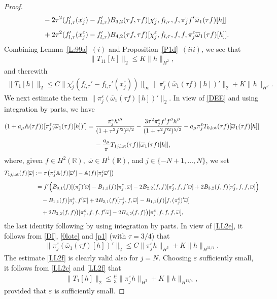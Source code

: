 \documentclass[11pt,reqno]{amsart}
\numberwithin{equation}{section}
\newcommand{\0}{\Omega}
\newcommand{\e}{\varepsilon}
\newcommand{\ov}{\overline}
\newcommand{\oo}{\ov\omega}
\newcommand{\bA}{\mathbb{A}}
\newcommand{\R}{\mathbb{R}}
\numberwithin{equation}{section}
\begin{document}
\begin{proof}
\begin{align*}
 &\hspace{0.424cm}-2\tau^2 (f_{l,\tau}'(x_j^\e)-f_{l,\tau}')B_{3,2}(\tau f, \tau f)  [\chi_j^\e,f_{l,\tau},f,\pi_j^\e f' \oo_1(\tau f)[h]]\\[1ex]
 &\hspace{0.424cm}+2\tau^2 (f_{l,\tau}'(x_j^\e)-f_{l,\tau}')B_{4,2}(\tau f, \tau f)  [\chi_j^\e,f_{l,\tau},f,f,\pi_j^\e \oo_1(\tau f)[h]].
\end{align*}
 Combining Lemma~\ref{L:99a}~$(i)$ and Proposition~\ref{P1d}~$(iii)$, we see that
 \begin{align*}
  \|T_{11}[h]\|_{2}\leq   K\|h\|_{H^2},
\end{align*}
and  therewith
 \begin{align}
  \|T_{1}[h]\|_{2}\leq   C\|\chi_j^\e(f_{l,\tau}'-f_{l,\tau}'(x_j^\e))  \|_\infty\|\pi^\e_j(\oo_1(\tau f)[h])' \|_2+ K\|h\|_{H^2}.\label{LL2c}
\end{align}
We next estimate the term $\|\pi^\e_j(\oo_1(\tau f)[h])' \|_2$.
In view of \eqref{DEE} and using integration by parts, we have
\begin{align}
 (1+a_\mu \bA(\tau f))[\pi_j^\e(\oo_1(\tau f)[h])']&=\frac{ \pi_j^\e h'''}{(1+\tau^2f'^2)^{3/2}}-\frac{3\tau^2\pi_j^\e f'f'' h''}{(1+\tau^2f'^2)^{5/2}}-a_\mu \pi_j^\e T_{0,{\rm lot}}(\tau f)[\oo_1(\tau f)[h]]\nonumber\\[1ex]
 &\hspace{0.424cm}-\frac{ a_\mu }{\pi}T_{1j,{\rm lot}}(\tau f)[\oo_1(\tau f)[h]],\label{LL2e}
\end{align}
where, given $f\in H^2(\R), $   $\oo\in H^1(\R)$, and $j\in\{-N+1,\ldots, N\}$, we set 
\begin{align}
 T_{1j,{\rm lot}}(f)[\oo]&:=\pi\big(\pi_j^\e\bA(f)[\oo']-\bA(f)[\pi_j^\e\oo']\big)\nonumber\\[1ex]
 &\phantom{:}=f'\Big(B_{0,1}(f)[(\pi_j^\e)'\oo]-B_{1,1}( f)[\pi_j^\e, \oo ] -2 B_{2,2}(f, f)[\pi_j^\e,f,f'\oo] +2B_{3,2}(f ,f)[\pi_j^\e,f,f,\oo]\Big)\nonumber\\[1ex]
&\hspace{0.424cm}-B_{1,1}(f)[\pi_j^\e,f'\oo]+2B_{2,1}(f)[\pi_j^\e,f, \oo ] -B_{1,1}(f)[f,(\pi_j^\e)'\oo] \nonumber\\[1ex]
&\hspace{0.424cm}+2 B_{3,2}(f, f)\big)[\pi_j^\e,f,f,f'\oo]-2B_{4,2}(f, f)\big)[\pi_j^\e,f,f,f,\oo],\label{T1j}
\end{align}
the last identity following by using integration by parts.
In view of \eqref{LL2e}, it follows from \eqref{DI},  \eqref{0lote} and \eqref{p1} (with $\tau=3/4$) that 
\begin{align}
  \|\pi_j^\e(\oo_1(\tau f)[h])'\|_{2}\leq  C\|\pi^\e_j h \|_{H^3}+ K\|h\|_{H^{11/4}}.\label{LL2f}
\end{align}
The estimate \eqref{LL2f} is clearly valid also for $j=N$.
Choosing $\e$ sufficiently small, it follows from \eqref{LL2c} and  \eqref{LL2f}  that 
\begin{align}
  \|T_{1}[h]\|_{2}\leq  \frac{\mu}{3}\|\pi^\e_j h \|_{H^3}+ K\|h\|_{H^{11/4}},\label{LL2aa}
\end{align}
provided that $\e$ is sufficiently small.  


\end{proof}
\end{document}
